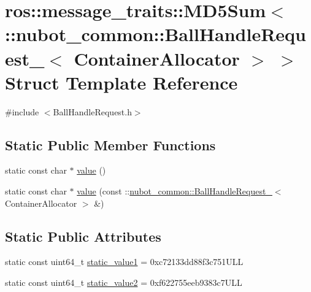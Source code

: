 \hypertarget{structros_1_1message__traits_1_1MD5Sum_3_01_1_1nubot__common_1_1BallHandleRequest___3_01ContainerAllocator_01_4_01_4}{\section{ros\-:\-:message\-\_\-traits\-:\-:M\-D5\-Sum$<$ \-:\-:nubot\-\_\-common\-:\-:Ball\-Handle\-Request\-\_\-$<$ Container\-Allocator $>$ $>$ Struct Template Reference}
\label{structros_1_1message__traits_1_1MD5Sum_3_01_1_1nubot__common_1_1BallHandleRequest___3_01ContainerAllocator_01_4_01_4}
}


{\ttfamily \#include $<$Ball\-Handle\-Request.\-h$>$}

\subsection*{Static Public Member Functions}
\begin{DoxyCompactItemize}
\item 
static const char $\ast$ \hyperlink{structros_1_1message__traits_1_1MD5Sum_3_01_1_1nubot__common_1_1BallHandleRequest___3_01ContainerAllocator_01_4_01_4_af9117a2f3333c1e8b038342ece6c487e}{value} ()
\item 
static const char $\ast$ \hyperlink{structros_1_1message__traits_1_1MD5Sum_3_01_1_1nubot__common_1_1BallHandleRequest___3_01ContainerAllocator_01_4_01_4_a16b44c2444f96086740c2365c0c39d9f}{value} (const \-::\hyperlink{structnubot__common_1_1BallHandleRequest__}{nubot\-\_\-common\-::\-Ball\-Handle\-Request\-\_\-}$<$ Container\-Allocator $>$ \&)
\end{DoxyCompactItemize}
\subsection*{Static Public Attributes}
\begin{DoxyCompactItemize}
\item 
static const uint64\-\_\-t \hyperlink{structros_1_1message__traits_1_1MD5Sum_3_01_1_1nubot__common_1_1BallHandleRequest___3_01ContainerAllocator_01_4_01_4_aebf203e5496741b738e0d0a379603499}{static\-\_\-value1} = 0xc72133dd88f3c751\-U\-L\-L
\item 
static const uint64\-\_\-t \hyperlink{structros_1_1message__traits_1_1MD5Sum_3_01_1_1nubot__common_1_1BallHandleRequest___3_01ContainerAllocator_01_4_01_4_ad3eaea3675b75b22286a974fcb165357}{static\-\_\-value2} = 0xf622755eeb9383c7\-U\-L\-L
\end{DoxyCompactItemize}


